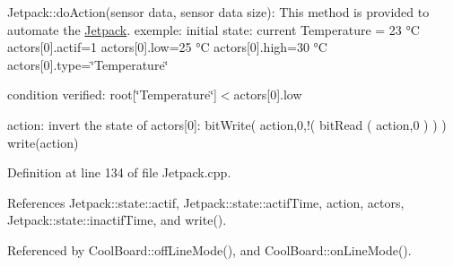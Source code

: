 Jetpack\+::do\+Action(sensor data, sensor data size)\+: This method is provided to automate the \hyperlink{classJetpack}{Jetpack}. exemple\+: initial state\+: current Temperature = 23 °C actors\mbox{[}0\mbox{]}.actif=1 actors\mbox{[}0\mbox{]}.low=25 °C actors\mbox{[}0\mbox{]}.high=30 °C actors\mbox{[}0\mbox{]}.type=\char`\"{}\+Temperature\char`\"{}

condition verified\+: root\mbox{[}\char`\"{}\+Temperature\char`\"{}\mbox{]}$<$actors\mbox{[}0\mbox{]}.low

action\+: invert the state of actors\mbox{[}0\mbox{]}\+: bit\+Write( action,0,!( bit\+Read ( action,0 ) ) ) write(action) 

Definition at line 134 of file Jetpack.\+cpp.



References Jetpack\+::state\+::actif, Jetpack\+::state\+::actif\+Time, action, actors, Jetpack\+::state\+::inactif\+Time, and write().



Referenced by Cool\+Board\+::off\+Line\+Mode(), and Cool\+Board\+::on\+Line\+Mode().


